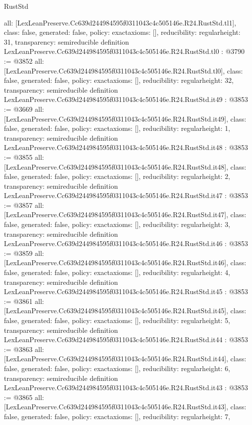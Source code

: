 \begin{lexlean}{RustStd}
\begin{coremodule}
{  all: [LexLeanPreserve.Cc639d244984595f0311043c4c505146e.R24.RustStd.tl1],
  class: false,
  generated: false,
  policy: exact{axioms: []},
  reducibility: regular{height: 31},
  transparency: semireducible
}
definition LexLeanPreserve.Cc639d244984595f0311043c4c505146e.R24.RustStd.tl0 : @3790 := @3852 {
  all: [LexLeanPreserve.Cc639d244984595f0311043c4c505146e.R24.RustStd.tl0],
  class: false,
  generated: false,
  policy: exact{axioms: []},
  reducibility: regular{height: 32},
  transparency: semireducible
}
definition LexLeanPreserve.Cc639d244984595f0311043c4c505146e.R24.RustStd.it49 : @3853 := @3669 {
  all: [LexLeanPreserve.Cc639d244984595f0311043c4c505146e.R24.RustStd.it49],
  class: false,
  generated: false,
  policy: exact{axioms: []},
  reducibility: regular{height: 1},
  transparency: semireducible
}
definition LexLeanPreserve.Cc639d244984595f0311043c4c505146e.R24.RustStd.it48 : @3853 := @3855 {
  all: [LexLeanPreserve.Cc639d244984595f0311043c4c505146e.R24.RustStd.it48],
  class: false,
  generated: false,
  policy: exact{axioms: []},
  reducibility: regular{height: 2},
  transparency: semireducible
}
definition LexLeanPreserve.Cc639d244984595f0311043c4c505146e.R24.RustStd.it47 : @3853 := @3857 {
  all: [LexLeanPreserve.Cc639d244984595f0311043c4c505146e.R24.RustStd.it47],
  class: false,
  generated: false,
  policy: exact{axioms: []},
  reducibility: regular{height: 3},
  transparency: semireducible
}
definition LexLeanPreserve.Cc639d244984595f0311043c4c505146e.R24.RustStd.it46 : @3853 := @3859 {
  all: [LexLeanPreserve.Cc639d244984595f0311043c4c505146e.R24.RustStd.it46],
  class: false,
  generated: false,
  policy: exact{axioms: []},
  reducibility: regular{height: 4},
  transparency: semireducible
}
definition LexLeanPreserve.Cc639d244984595f0311043c4c505146e.R24.RustStd.it45 : @3853 := @3861 {
  all: [LexLeanPreserve.Cc639d244984595f0311043c4c505146e.R24.RustStd.it45],
  class: false,
  generated: false,
  policy: exact{axioms: []},
  reducibility: regular{height: 5},
  transparency: semireducible
}
definition LexLeanPreserve.Cc639d244984595f0311043c4c505146e.R24.RustStd.it44 : @3853 := @3863 {
  all: [LexLeanPreserve.Cc639d244984595f0311043c4c505146e.R24.RustStd.it44],
  class: false,
  generated: false,
  policy: exact{axioms: []},
  reducibility: regular{height: 6},
  transparency: semireducible
}
definition LexLeanPreserve.Cc639d244984595f0311043c4c505146e.R24.RustStd.it43 : @3853 := @3865 {
  all: [LexLeanPreserve.Cc639d244984595f0311043c4c505146e.R24.RustStd.it43],
  class: false,
  generated: false,
  policy: exact{axioms: []},
  reducibility: regular{height: 7},
}
\end{coremodule}
\end{lexlean}
